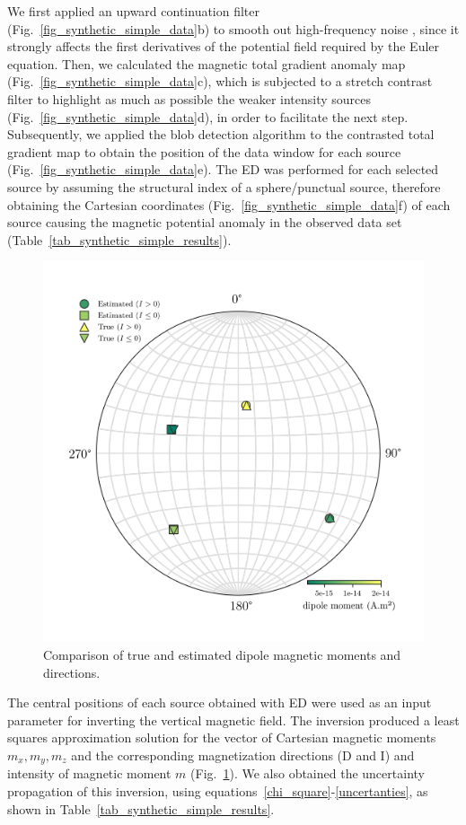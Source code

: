 We first applied an upward continuation filter (Fig.~\ref{fig_synthetic_simple_data}b) to smooth out high-frequency noise \citep{Blakely1996}, since it strongly affects the first derivatives of the potential field required by the Euler equation. Then, we calculated the magnetic total gradient anomaly map (Fig.~\ref{fig_synthetic_simple_data}c), which is subjected to a stretch contrast filter to highlight as much as possible the weaker intensity sources (Fig.~\ref{fig_synthetic_simple_data}d), 
in order to facilitate the next step. Subsequently, we applied the blob detection algorithm to the contrasted total gradient map to obtain the position of the data window for each source (Fig.~\ref{fig_synthetic_simple_data}e). The ED was performed for each selected source by assuming the structural index of a sphere/punctual source, therefore obtaining the Cartesian coordinates (Fig.~\ref{fig_synthetic_simple_data}f) of each source causing the magnetic potential anomaly in the observed data set (Table~\ref{tab_synthetic_simple_results}).

\begin{figure}[tb!]
\centering
\includegraphics[width=0.5\linewidth]{figures/simple-synthetic-dipole-moment.png}
\caption{
Comparison of true and estimated dipole magnetic moments and directions.
}
\label{fig_synthetic_simple_results}
\end{figure}

The central positions of each source obtained with ED were used as an input parameter for inverting the vertical magnetic field. The inversion produced a least squares approximation solution for the vector of Cartesian magnetic moments $m_x, m_y, m_z$ and the corresponding magnetization directions (D and I) and intensity of magnetic moment $m$ (Fig.~\ref{fig_synthetic_simple_results}). We also obtained the uncertainty propagation of this inversion, using equations~\ref{chi_square}-\ref{uncertanties}, as shown in Table~\ref{tab_synthetic_simple_results}.

